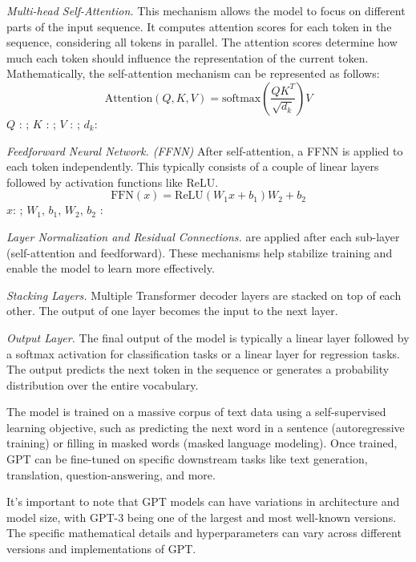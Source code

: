 {\em Multi-head Self-Attention.} This mechanism allows the model to
focus on different parts of the input sequence. It computes attention
scores for each token in the sequence, considering all tokens in
parallel. The attention scores determine how much each token should
influence the representation of the current token. Mathematically, the
self-attention mechanism can be represented as follows:
$$\text{Attention}(Q, K, V) = \text{softmax}\left(\frac{QK^T}{\sqrt{d_k}}\right)V$$
$Q$ : ; $K$ : ; $V$ : ; $d_k$: 

{\em Feedforward Neural Network. (FFNN)} After self-attention, a FFNN is applied to each token independently. This typically consists of a couple of linear layers followed by activation functions like ReLU.
\[
\text{FFN}(x) = \text{ReLU}(W_1x + b_1)W_2 + b_2
\]
$x$: ; $W_1$, $b_1$, $W_2$, $b_2$ : 

{\em Layer Normalization and Residual Connections.} are applied after each
sub-layer (self-attention and feedforward). These mechanisms help
stabilize training and enable the model to learn more effectively.


{\em Stacking Layers.} Multiple Transformer decoder layers are stacked
on top of each other. The output of one layer becomes the input to the
next layer.

{\em Output Layer.} The final output of the model is typically a
linear layer followed by a softmax activation for classification tasks
or a linear layer for regression tasks. The output predicts the next
token in the sequence or generates a probability distribution over the
entire vocabulary.

The model is trained on a massive corpus of text data using a self-supervised learning objective, such as predicting the next word in a sentence (autoregressive training) or filling in masked words (masked language modeling). Once trained, GPT can be fine-tuned on specific downstream tasks like text generation, translation, question-answering, and more.

It's important to note that GPT models can have variations in
architecture and model size, with GPT-3 being one of the largest and
most well-known versions. The specific mathematical details and
hyperparameters can vary across different versions and implementations
of GPT.

%


